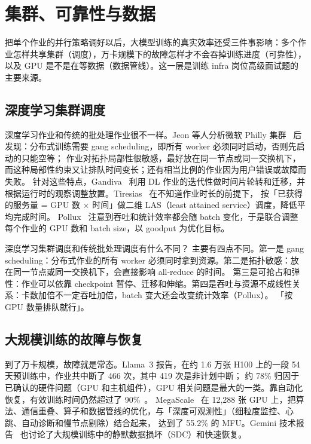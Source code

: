 \section{集群、可靠性与数据}
\label{sec:cluster}

把单个作业的并行策略调好以后，大模型训练的真实效率还受三件事影响：多个作业怎样共享集群（调度），万卡规模下的故障怎样才不会吞掉训练进度（可靠性），
以及 GPU 是不是在等数据（数据管线）。这一层是训练 infra 岗位高级面试题的主要来源。

\subsection{深度学习集群调度}

深度学习作业和传统的批处理作业很不一样。Jeon 等人分析微软 Philly 集群~\cite{jeon2019analysis} 后发现：分布式训练需要 gang scheduling，即所有 worker 必须同时启动，否则先启动的只能空等；
作业对拓扑局部性很敏感，最好放在同一节点或同一交换机下，而这种局部性约束又让排队时间变长；还有相当比例的作业因为用户错误或故障而失败。
针对这些特点，Gandiva~\cite{xiao2018gandiva} 利用 DL 作业的迭代性做时间片轮转和迁移，并根据运行时的观察调整放置。Tiresias~\cite{gu2019tiresias} 在不知道作业时长的前提下，
按「已获得的服务量 = GPU 数 $\times$ 时间」做二维 LAS（least attained service）调度，降低平均完成时间。
Pollux~\cite{qiao2021pollux} 注意到吞吐和统计效率都会随 batch 变化，于是联合调整每个作业的 GPU 数和 batch size，以 goodput 为优化目标。

\begin{qa}{深度学习集群调度和传统批处理调度有什么不同？}
\ans 主要有四点不同。第一是 gang scheduling：分布式作业的所有 worker 必须同时拿到资源。第二是拓扑敏感：放在同一节点或同一交换机下，会直接影响 all-reduce 的时间。
第三是可抢占和弹性：作业可以依靠 checkpoint 暂停、迁移和伸缩。第四是吞吐与资源不成线性关系：卡数加倍不一定吞吐加倍，batch 变大还会改变统计效率（Pollux）。
\wrong 「按 GPU 数量排队就行」。
\end{qa}

\subsection{大规模训练的故障与恢复}

到了万卡规模，故障就是常态。Llama~3 报告，在约 1.6 万张 H100 上的一段 54 天预训练中，作业共中断了 466 次，其中 419 次是非计划中断；
约 78\% 归因于已确认的硬件问题（GPU 和主机组件），GPU 相关问题是最大的一类。靠自动化恢复，有效训练时间仍然超过了 90\%~\cite{dubey2024llama3}。
MegaScale~\cite{jiang2024megascale} 在 12,288 张 GPU 上，把算法、通信重叠、算子和数据管线的优化，与「深度可观测性」（细粒度监控、心跳、自动诊断和慢节点剔除）结合起来，
达到了 55.2\% 的 MFU。Gemini 技术报告~\cite{geminiteam2023gemini} 也讨论了大规模训练中的静默数据损坏（SDC）和快速恢复。

